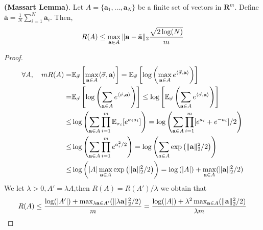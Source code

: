 \begin{lemma}
    \textbf{(Massart Lemma)}.
    Let $ A = \{ \mathbf{a}_1, \ldots, \mathbf{a}_N \} $ be a finite set of vectors in $ \mathbf{R}^m $.
    Define $ \bar{ \mathbf{a}} = \frac{1}{N} \sum^{N}_{i=1} \mathbf{a}_i $. Then,
    \begin{equation}
        R(A) \le \max_{\mathbf{a} \in A} \Arrowvert \mathbf{a} - \bar{\mathbf{a}} \Arrowvert_2
        \frac{\sqrt{2\log(N)}}{m} 
    \end{equation}
    \begin{proof}
        \begin{align*}
            \forall A,\quad
            m R(A) =& \mathbb{E}_{\vec\sigma} \left[ \max_{\mathbf{a}\in A } \langle \vec \sigma, \textbf{a} \rangle \right]
            = \mathbb{E}_{\vec\sigma}\left[ \log \left(  \max_{\mathbf{a}\in A } e^{\langle \vec \sigma, \textbf{a} \rangle } \right) \right]\\
            =& \mathbb{E}_{\vec\sigma}\left[ \log \left(  \sum_{\mathbf{a}\in A } e^{\langle \vec \sigma, \textbf{a} \rangle } \right) \right]
            \le \log \left[ \mathbb{E}_{\vec\sigma} \left(  \sum_{\mathbf{a}\in A } e^{\langle \vec \sigma, \textbf{a} \rangle } \right) \right] \\
            \le& \log \left(  \sum_{\mathbf{a}\in A } \prod^m_{i=1} \mathbb{E}_{\sigma_i} [e^{\sigma_i a_i}] \right) 
            = \log \left(  \sum_{\mathbf{a}\in A } \prod^m_{i=1} [e^{a_i} + e^{-a_i}]/2 \right) \\
            \le& \log \left(  \sum_{\mathbf{a}\in A } \prod^m_{i=1} e^{a_i^2/2} \right) 
            = \log \left( \sum^{}_{a \in A} \exp \left( \Arrowvert \mathbf{a} \Arrowvert_2^2/2 \right) \right)\\
            \le& \log \left( \left| A \right| \max_{\mathbf{a} \in A} \exp \left( \Arrowvert \mathbf{a} \Arrowvert_2^2/2 \right) \right) = \log \left( \left| A \right| \right) + \max_{\mathbf{a} \in A } (\Arrowvert \mathbf{a} \Arrowvert_2^2 /2)
        \end{align*}
        We let $ \lambda > 0,  A' = \lambda A $,then $ R(A) = R(A')/\lambda $ we obtain that
        \[
            R(A) \le \frac{\log(|A'|) + \max_{\lambda\mathbf{a} \in A' } (\Arrowvert \lambda\mathbf{a} \Arrowvert_2^2 /2)}{m}= \frac{\log(|A|) + \lambda^2 \max_{\mathbf{a} \in A } (\Arrowvert \mathbf{a} \Arrowvert_2^2 /2)}{\lambda m}
        \]
    \end{proof}
\end{lemma}

